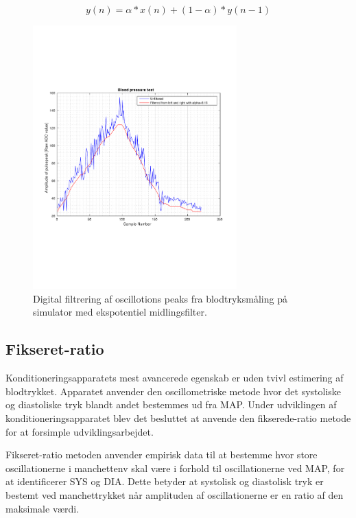 \begin{equation}
y(n)=\alpha*x(n)+(1-\alpha)*y(n-1)
\label{eq:ekspotentielmidlingsfilter}
\end{equation}
\begin{figure}[H]
	\centering
	\includegraphics[trim={0 0 0 0},clip, width=0.7\textwidth]{billeder/digitalFilterData.pdf}	
	\parbox{10.5cm}{\caption{Digital filtrering af oscillotions peaks fra blodtryksmåling på simulator med ekspotentiel midlingsfilter.}\label{fig:digitalFilterData}}
\end{figure}


\subsection{Fikseret-ratio} \label{Fikseret-ratio}
Konditioneringsapparatets mest avancerede egenskab er uden tvivl estimering af blodtrykket. Apparatet anvender den oscillometriske metode hvor det systoliske og diastoliske tryk blandt andet bestemmes ud fra MAP. Under udviklingen af konditioneringsapparatet blev det besluttet at anvende den fikserede-ratio metode for at forsimple udviklingsarbejdet.

Fikseret-ratio metoden anvender empirisk data til at bestemme hvor store oscillationerne i manchettenv skal være i forhold til oscillationerne ved MAP, for at identificerer SYS og DIA. Dette betyder at systolisk og diastolisk tryk er bestemt ved manchettrykket når amplituden af oscillationerne er en ratio af den maksimale værdi.

